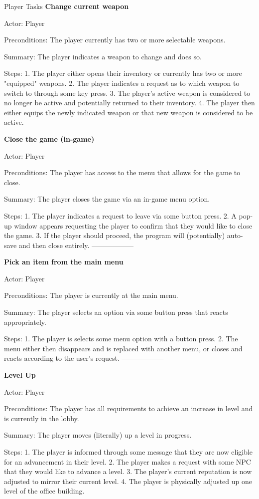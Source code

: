 \documentclass[12pt]{report}
\begin{document}
\begin {section}{Player Tasks}
\textbf {Change current weapon} %

Actor: Player

Preconditions: The player currently has two or more selectable weapons.

Summary: The player indicates a weapon to change and does so.

Steps:
1. The player either opens their inventory or currently has two or more "equipped" weapons.
2. The player indicates a request as to which weapon to switch to through some key press.
3. The player's active weapon is considered to no longer be active and potentially returned to their inventory.
4. The player then either equips the newly indicated weapon or that new weapon is considered to be active.
------------------

\textbf {Close the game (in-game)} %

Actor: Player

Preconditions: The player has access to the menu that allows for the game to close.

Summary: The player closes the game via an in-game menu option.

Steps:
1. The player indicates a request to leave via some button press.
2. A pop-up window appears requesting the player to confirm that they would like to close the game.
3. If the player should proceed, the program will (potentially) auto-save and then close entirely.
------------------

\textbf {Pick an item from the main menu} %

Actor: Player

Preconditions: The player is currently at the main menu.

Summary: The player selects an option via some button press that reacts appropriately.

Steps:
1. The player is selects some menu option with a button press.
2. The menu either then disappears and is replaced with another menu, or closes and reacts according to the user's request.
------------------

\textbf {Level Up} %

Actor: Player

Preconditions: The player has all requirements to achieve an increase in level and is currently in the lobby.

Summary: The player moves (literally) up a level in progress.

Steps:
1. The player is informed through some message that they are now eligible for an advancement in their level.
2. The player makes a request with some NPC that they would like to advance a level.
3. The player's current reputation is now adjusted to mirror their current level.
4. The player is physically adjusted up one level of the office building.


\end{section}
\end{document}
